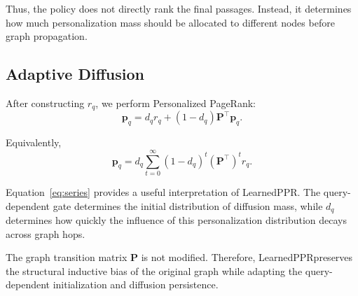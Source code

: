 \documentclass[conference]{IEEEtran}
\newcommand{\method}{LearnedPPR}
\newcommand{\q}{q}
\newcommand{\reset}{r}
\begin{document}
Thus, the policy does not directly rank the final passages. Instead,
it determines how much personalization mass should be allocated to
different nodes before graph propagation.


\subsection{Adaptive Diffusion}

After constructing $\reset_{\q}$, we perform Personalized PageRank:
\begin{equation}
\mathbf{p}_{\q}
=
d_{\q}\reset_{\q}
+
(1-d_{\q})\mathbf{P}^{\top}\mathbf{p}_{\q}.
\label{eq:adaptiveppr}
\end{equation}

Equivalently,
\begin{equation}
\mathbf{p}_{\q}
=
d_{\q}
\sum_{t=0}^{\infty}
(1-d_{\q})^t
(\mathbf{P}^{\top})^t
\reset_{\q}.
\label{eq:series}
\end{equation}

Equation~\eqref{eq:series} provides a useful interpretation of
\method. The query-dependent gate determines the initial distribution
of diffusion mass, while $d_{\q}$ determines how quickly the influence
of this personalization distribution decays across graph hops.

The graph transition matrix $\mathbf{P}$ is not modified. Therefore,
\method preserves the structural inductive bias of the original graph
while adapting the query-dependent initialization and diffusion
persistence.
\end{document}
